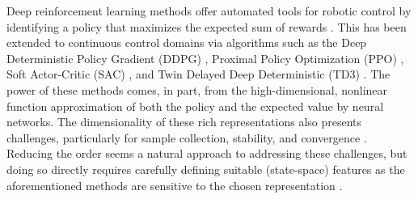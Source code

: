 \documentclass{article}
\begin{document}
Deep reinforcement learning methods offer automated tools for robotic control by identifying a policy that maximizes the expected sum of rewards \cite{henderson2018deep}.
This has been extended to continuous control domains via algorithms such as the Deep Deterministic Policy Gradient (DDPG) \cite{DDPG}, Proximal Policy Optimization (PPO) \cite{PPO}, Soft Actor-Critic (SAC) \cite{SAC}, and Twin Delayed Deep Deterministic (TD3) \cite{TD3}.
The power of these methods comes, in part, from the high-dimensional, nonlinear function approximation of both the policy and the expected value by neural networks.
The dimensionality of these rich representations also presents challenges, particularly for sample collection, stability, and convergence \cite{Islam2017}.
Reducing the order seems a natural approach to addressing these challenges, but doing so directly requires carefully defining suitable (state-space) features as the aforementioned methods are sensitive to the chosen representation \cite{bhatnagar2009convergent}.  
\end{document}

